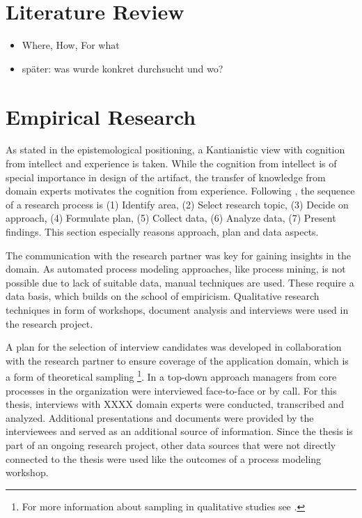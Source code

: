 		
	\section{Literature Review}
		\begin{itemize}
			\item Where, How, For what
			\item später: was wurde konkret durchsucht und wo? 
		\end{itemize}
	\section{Empirical Research}
	As stated in the epistemological positioning, a Kantianistic view with cognition from intellect and experience is taken. While the cognition from intellect is of special importance in design of the artifact, the transfer of knowledge from domain experts motivates the cognition from experience. 
	Following \cite{gilljohnson}, the sequence of a research process is (1) Identify area, (2) Select research topic, (3) Decide on approach, (4) Formulate plan, (5) Collect data, (6) Analyze data, (7) Present findings. This section especially reasons approach, plan and data aspects. 
	
	The communication with the research partner was key for gaining insights in the domain. As automated process modeling approaches, like process mining, is not possible due to lack of suitable data, manual techniques are used. These require a data basis, which builds on the school of empiricism. Qualitative research techniques in form of workshops, document analysis and interviews were used in the research project. 
	
	A plan for the selection of interview candidates was developed in collaboration with the research partner to ensure coverage of the application domain, which is a form of theoretical sampling \footnote{For more information about sampling in qualitative studies see \cite{coyne1997sampling}.}. In a top-down approach managers from core processes in the organization were interviewed face-to-face or by call. For this thesis, interviews with XXXX domain experts were conducted, transcribed and analyzed. Additional presentations and documents were provided by the interviewees and served as an additional source of information. Since the thesis is part of an ongoing research project, other data sources that were not directly connected to the thesis were used like the outcomes of a process modeling workshop.
	
